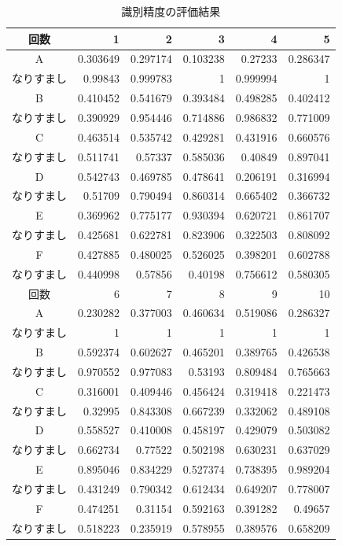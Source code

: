 \begin{table}[btph]
  \centering
  \caption{識別精度の評価結果}
  \label{auth-result}
  \begin{tabular}{|c|r|r|r|r|r|} \hline
    回数 & 1 & 2 & 3 & 4 & 5 \\ \hline
    A & 0.303649 & 0.297174 & 0.103238 & 0.27233 & 0.286347 \\
    なりすまし & 0.99843 & 0.999783 & 1 & 0.999994 & 1 \\ \hline
    B & 0.410452 & 0.541679 & 0.393484 & 0.498285 & 0.402412 \\
    なりすまし & 0.390929 & 0.954446 & 0.714886 & 0.986832 & 0.771009 \\ \hline
    C & 0.463514 & 0.535742 & 0.429281 & 0.431916 & 0.660576 \\ %
    なりすまし & 0.511741 & 0.57337 & 0.585036 & 0.40849 & 0.897041 \\ \hline
    D & 0.542743 & 0.469785 & 0.478641 & 0.206191 & 0.316994 \\
    なりすまし & 0.51709 & 0.790494 & 0.860314 & 0.665402 & 0.366732 \\ \hline
    E & 0.369962 & 0.775177 & 0.930394 & 0.620721 & 0.861707 \\
    なりすまし & 0.425681 & 0.622781 & 0.823906 & 0.322503 & 0.808092 \\ \hline
    F & 0.427885 & 0.480025 & 0.526025 & 0.398201 & 0.602788 \\
    なりすまし & 0.440998 & 0.57856 & 0.40198 & 0.756612 & 0.580305 \\ \hline \hline
    回数 & 6 & 7 & 8 & 9 & 10 \\ \hline
    A & 0.230282 & 0.377003 & 0.460634 & 0.519086 & 0.286327 \\
    なりすまし & 1 & 1 & 1 & 1 & 1 \\ \hline
    B & 0.592374 & 0.602627 & 0.465201 & 0.389765 & 0.426538 \\
    なりすまし & 0.970552 & 0.977083 & 0.53193 & 0.809484 & 0.765663 \\ \hline
    C & 0.316001 & 0.409446 & 0.456424 & 0.319418 & 0.221473 \\
    なりすまし & 0.32995 & 0.843308 & 0.667239 & 0.332062 & 0.489108 \\ \hline
    D & 0.558527 & 0.410008 & 0.458197 & 0.429079 & 0.503082 \\
    なりすまし & 0.662734 & 0.77522 & 0.502198 & 0.630231 & 0.637029 \\ \hline
    E & 0.895046 & 0.834229 & 0.527374 & 0.738395 & 0.989204 \\
    なりすまし & 0.431249 & 0.790342 & 0.612434 & 0.649207 & 0.778007 \\ \hline
    F & 0.474251 & 0.31154 & 0.592163 & 0.391282 & 0.49657 \\
    なりすまし & 0.518223 & 0.235919 & 0.578955 & 0.389576 & 0.658209 \\ \hline
  \end{tabular}
\end{table}

